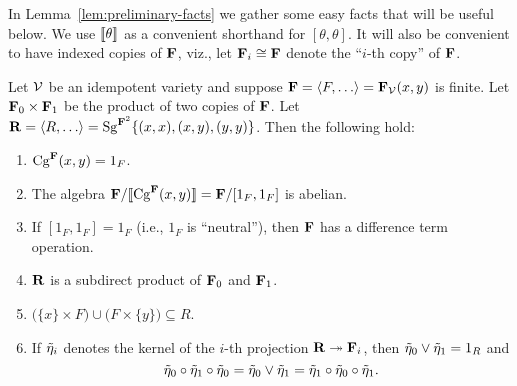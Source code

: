 In Lemma~\ref{lem:preliminary-facts} we gather
some easy facts that will be useful below.
We use $\llbracket \theta \rrbracket$ as a convenient shorthand for 
$[\theta,\theta]$. %
It will also be convenient to have indexed copies of $\mathbf{F}$, viz.,
let $\mathbf{F}_i \cong \mathbf{F}$ denote the ``$i$-th copy'' of $\mathbf{F}$. 
\begin{lemma}
\label{lem:preliminary-facts}
Let $\mathcal{V}$ be an idempotent variety and suppose 
$\bF = \<F, \dots\> = \bF_{\sV}(x,y)$ is finite. 
Let $\mathbf{F}_0 \times \mathbf{F}_1$ be the product of two copies of $\mathbf{F}$.
Let $\bR = \<R, \dots\> = \Sg^{\bF^2}\{(x, x), (x, y), (y, y)\}$. 
Then the following hold:
\begin{enumerate}
\item \label{item:1}
  $\operatorname{Cg}^{\mathbf{F}}(x,y) = 1_F$.

  \smallskip
\item \label{item:2}
The algebra $\mathbf{F}/\llbracket \operatorname{Cg}^{\mathbf{F}}(x,y) \rrbracket = \mathbf{F}/[1_F, 1_F]$ is abelian.

\smallskip
\item \label{item:1.5}
  If $[1_F, 1_F] = 1_F$ (i.e., $1_F$ is ``neutral''), then
  $\mathbf{F}$ has a difference term operation.


\smallskip
\item \label{item:3}
$\mathbf{R}$ is a subdirect product of $\mathbf{F}_0$ and $\mathbf{F}_1$.

\smallskip
\item \label{item:4}
$\bigl(\{x\} \times F\bigr) \cup \bigl(F \times \{y\}\bigr) \subseteq R$.

\smallskip
\item \label{item:5}
If $\tilde{\eta}_i$ denotes the kernel of the
$i$-th projection $\mathbf{R} \twoheadrightarrow \mathbf{F}_i$, then 
$\tilde{\eta}_0 \vee \tilde{\eta}_1 = 1_R$ and 
\[
\tilde{\eta}_0 \circ \tilde{\eta}_1 \circ \tilde{\eta}_0 = \tilde{\eta}_0 \vee \tilde{\eta}_1 = 
  \tilde{\eta}_1 \circ \tilde{\eta}_0 \circ \tilde{\eta}_1.
\]
\end{enumerate}
\end{lemma}
